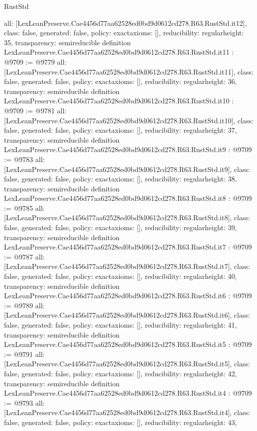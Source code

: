 \begin{lexlean}{RustStd}
\begin{coremodule}
{  all: [LexLeanPreserve.Cae4456d77aa62528ed0bd9d0612cd278.R63.RustStd.it12],
  class: false,
  generated: false,
  policy: exact{axioms: []},
  reducibility: regular{height: 35},
  transparency: semireducible
}
definition LexLeanPreserve.Cae4456d77aa62528ed0bd9d0612cd278.R63.RustStd.it11 : @9709 := @9779 {
  all: [LexLeanPreserve.Cae4456d77aa62528ed0bd9d0612cd278.R63.RustStd.it11],
  class: false,
  generated: false,
  policy: exact{axioms: []},
  reducibility: regular{height: 36},
  transparency: semireducible
}
definition LexLeanPreserve.Cae4456d77aa62528ed0bd9d0612cd278.R63.RustStd.it10 : @9709 := @9781 {
  all: [LexLeanPreserve.Cae4456d77aa62528ed0bd9d0612cd278.R63.RustStd.it10],
  class: false,
  generated: false,
  policy: exact{axioms: []},
  reducibility: regular{height: 37},
  transparency: semireducible
}
definition LexLeanPreserve.Cae4456d77aa62528ed0bd9d0612cd278.R63.RustStd.it9 : @9709 := @9783 {
  all: [LexLeanPreserve.Cae4456d77aa62528ed0bd9d0612cd278.R63.RustStd.it9],
  class: false,
  generated: false,
  policy: exact{axioms: []},
  reducibility: regular{height: 38},
  transparency: semireducible
}
definition LexLeanPreserve.Cae4456d77aa62528ed0bd9d0612cd278.R63.RustStd.it8 : @9709 := @9785 {
  all: [LexLeanPreserve.Cae4456d77aa62528ed0bd9d0612cd278.R63.RustStd.it8],
  class: false,
  generated: false,
  policy: exact{axioms: []},
  reducibility: regular{height: 39},
  transparency: semireducible
}
definition LexLeanPreserve.Cae4456d77aa62528ed0bd9d0612cd278.R63.RustStd.it7 : @9709 := @9787 {
  all: [LexLeanPreserve.Cae4456d77aa62528ed0bd9d0612cd278.R63.RustStd.it7],
  class: false,
  generated: false,
  policy: exact{axioms: []},
  reducibility: regular{height: 40},
  transparency: semireducible
}
definition LexLeanPreserve.Cae4456d77aa62528ed0bd9d0612cd278.R63.RustStd.it6 : @9709 := @9789 {
  all: [LexLeanPreserve.Cae4456d77aa62528ed0bd9d0612cd278.R63.RustStd.it6],
  class: false,
  generated: false,
  policy: exact{axioms: []},
  reducibility: regular{height: 41},
  transparency: semireducible
}
definition LexLeanPreserve.Cae4456d77aa62528ed0bd9d0612cd278.R63.RustStd.it5 : @9709 := @9791 {
  all: [LexLeanPreserve.Cae4456d77aa62528ed0bd9d0612cd278.R63.RustStd.it5],
  class: false,
  generated: false,
  policy: exact{axioms: []},
  reducibility: regular{height: 42},
  transparency: semireducible
}
definition LexLeanPreserve.Cae4456d77aa62528ed0bd9d0612cd278.R63.RustStd.it4 : @9709 := @9793 {
  all: [LexLeanPreserve.Cae4456d77aa62528ed0bd9d0612cd278.R63.RustStd.it4],
  class: false,
  generated: false,
  policy: exact{axioms: []},
  reducibility: regular{height: 43},
}
\end{coremodule}
\end{lexlean}
